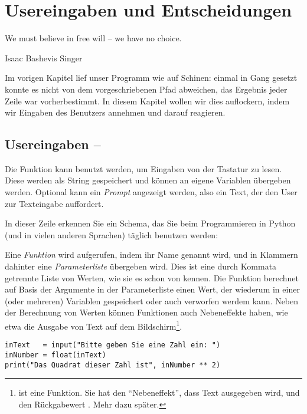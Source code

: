 \chapter{Usereingaben und Entscheidungen}
\epigraph{
	We must believe in free will -- we have no choice.
}{Isaac Bashevis Singer}

Im vorigen Kapitel lief unser Programm wie auf Schinen: einmal in Gang gesetzt konnte es nicht von dem vorgeschriebenen Pfad abweichen, das Ergebnis jeder Zeile war vorherbestimmt. In diesem Kapitel wollen wir dies auflockern, indem wir Eingaben des Benutzers annehmen und darauf reagieren.

\section{Usereingaben -- }
Die Funktion  kann benutzt werden, um Eingaben von der Tastatur zu lesen. Diese werden als String gespeichert und können an eigene Variablen übergeben werden. Optional kann ein \emph{Prompt} angezeigt werden, also ein Text, der den User zur Texteingabe auffordert.

\begin{codebox}
\end{codebox}

In dieser Zeile erkennen Sie ein Schema, das Sie beim Programmieren in Python (und in vielen anderen Sprachen) täglich benutzen werden:

Eine \emph{Funktion} wird aufgerufen, indem ihr Name genannt wird, und in Klammern dahinter eine \emph{Parameterliste} übergeben wird. Dies ist eine durch Kommata getrennte Liste von Werten, wie sie es schon von  kennen. Die Funktion berechnet auf Basis der Argumente in der Parameterliste einen Wert, der wiederum in einer (oder mehreren) Variablen gespeichert oder auch verworfen werdem kann. Neben der Berechnung von Werten können Funktionen auch Nebeneffekte haben, wie etwa die Ausgabe von Text auf dem Bildschirm\footnote{ ist eine Funktion. Sie hat den \enquote{Nebeneffekt}, dass Text ausgegeben wird, und den Rückgabewert . Mehr dazu später.}.

\begin{codebox}
\begin{verbatim}
inText   = input("Bitte geben Sie eine Zahl ein: ")
inNumber = float(inText)
print("Das Quadrat dieser Zahl ist", inNumber ** 2)
\end{verbatim}
\end{codebox}


